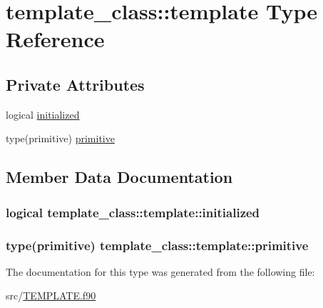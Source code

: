 \hypertarget{structtemplate__class_1_1template}{\section{template\+\_\+class\+:\+:template Type Reference}
\label{structtemplate__class_1_1template}
}
\subsection*{Private Attributes}
\begin{DoxyCompactItemize}
\item 
logical \hyperlink{structtemplate__class_1_1template_a298960ed9ac90b343825931d41da48a2}{initialized}
\item 
type(primitive) \hyperlink{structtemplate__class_1_1template_ae6f2d52744f8eddc4cff4eae9d8b366c}{primitive}
\end{DoxyCompactItemize}


\subsection{Member Data Documentation}
\hypertarget{structtemplate__class_1_1template_a298960ed9ac90b343825931d41da48a2}{
\subsubsection[{initialized}]{\setlength{\rightskip}{0pt plus 5cm}logical template\+\_\+class\+::template\+::initialized\hspace{0.3cm}{\ttfamily [private]}}}\label{structtemplate__class_1_1template_a298960ed9ac90b343825931d41da48a2}
\hypertarget{structtemplate__class_1_1template_ae6f2d52744f8eddc4cff4eae9d8b366c}{
\subsubsection[{primitive}]{\setlength{\rightskip}{0pt plus 5cm}type(primitive) template\+\_\+class\+::template\+::primitive\hspace{0.3cm}{\ttfamily [private]}}}\label{structtemplate__class_1_1template_ae6f2d52744f8eddc4cff4eae9d8b366c}


The documentation for this type was generated from the following file\+:\begin{DoxyCompactItemize}
\item 
src/\hyperlink{_t_e_m_p_l_a_t_e_8f90}{T\+E\+M\+P\+L\+A\+T\+E.\+f90}\end{DoxyCompactItemize}
